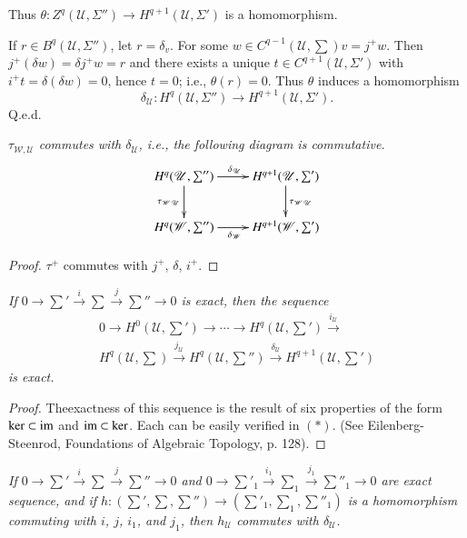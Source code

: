 \noindent
Thus $\theta : Z^q (\mathscr{U}, \Sigma'') \to H^{q+1} (\mathscr{U},
\Sigma')$ is a homomorphism. 

If $r \in B^q(\mathscr{U}, \Sigma'')$, let $r = \delta_v$. For some $w
\in C^{q-1} (\mathscr{U}, \sum) v = j^+ w$. Then $j^+ (\delta w)
=\delta j^+ w = r $ and there exists a unique $t \in C^{q+1}
(\mathscr{U}, \Sigma')$ with $i^+ t = \delta (\delta w) = 0$, hence $t
= 0$; i.e., $\theta (r) = 0$. Thus $\theta$ induces a homomorphism 
$$
\delta_{\mathscr{U}} : H^q (\mathscr{U}, \Sigma'') \to H^{q+1}
(\mathscr{U}, \Sigma') . 
$$
\hfill{Q.e.d.}

\textit{$\tau_{\mathscr{W}, \mathscr{U}}$ commutes with
  $\delta_{\mathscr{U}}$, i.e., the following diagram is
  commutative.} 
\[
\xymatrix{
H^q(\mathscr{U}, \sum'')
\ar[r]^{\delta_{\mathscr{U}}}\ar[d]_{\tau_{\mathscr{W}\mathscr{U}}} &
H^{q+1}(\mathscr{U}, \sum')\ar[d]^{\tau_{\mathscr{W}\mathscr{U}}} \\
H^q(\mathscr{W},\sum'') \ar[r]_{\delta_{\mathscr{W}}} &
H^{q+1}(\mathscr{W},\sum') 
}
\]

\begin{proof}
$\tau^+$ commutes with $j^+$, $\delta$, $i^+$.
\end{proof}

\textit{If $0 \to \sum' \xrightarrow{i} \sum \xrightarrow{j}
  \sum'' \to 0$ is exact, then the sequence} 
\begin{multline*}
0 \to H^0 \left(\mathscr{U}, \sum' \right) \to \cdots \to H^q \left(\mathscr{U},
\sum'\right) \xrightarrow{i_{\mathscr{U}}} \\
 H^q\left(\mathscr{U}, \sum \right)
\xrightarrow{j_{\mathscr{U}}} H^q \left(\mathscr{U},
\sum''\right)\xrightarrow{\delta_{\mathscr{U}}} H^{q+1} \left(\mathscr{U},
\sum' \right) 
\end{multline*}
\textit{is exact.}

\begin{proof} 
The\pageoriginale exactness of this sequence is the result of six
properties of the 
form $\ker \subset \operatorname{im}$ and $\operatorname{im} \subset \ker$. Each can be easily 
verified in $(*)$. (See Eilenberg-Steenrod, Foundations of Algebraic
Topology, p. 128). 
\end{proof}

\textit{If $0 \to \sum' \xrightarrow{i} \sum \xrightarrow{j}
  \sum'' \to 0$ and $0 \to \sum'_1 \xrightarrow{i_1} \sum_1
  \xrightarrow{j_1} \sum''_1 \to 0$ are exact sequence, and if $h :
  (\sum' , \sum, \sum'') \to (\sum'_1 , \sum_1 ,
  \sum''_1) $ is a homomorphism commuting with $i$, $j$, $i_1$, and
   $j_1$, then $h_{\mathscr{U}}$ commutes with
  $\delta_{\mathscr{U}}$.} 

